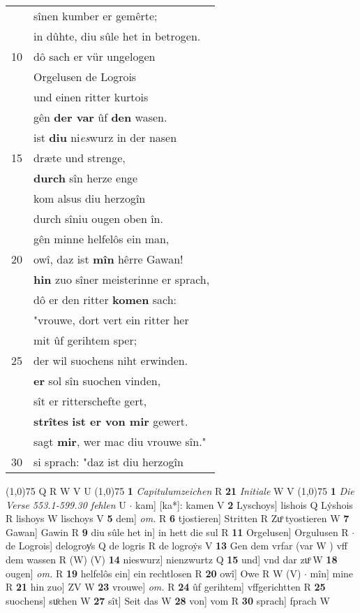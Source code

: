 \documentclass[8pt,a4paper,notitlepage]{article}
\begin{document}
\begin{table}[ht]
\begin{minipage}[t]{0.5\linewidth}
\begin{tabular}{rl}
 & sînen kumber er gemêrte;\\ 
 & in dûhte, diu sûle het in betrogen.\\ 
10 & dô sach er vür ungelogen\\ 
 & Orgelusen de Logrois\\ 
 & und einen ritter kurtois\\ 
 & gên \textbf{der var} ûf \textbf{den} wasen.\\ 
 & ist \textbf{diu} ni\textit{es}wurz in der nasen\\ 
15 & dræte und strenge,\\ 
 & \textbf{durch} sîn herze enge\\ 
 & kom alsus diu herzogîn\\ 
 & durch sîniu ougen oben în.\\ 
 & gên minne helfelôs ein man,\\ 
20 & owî, daz ist \textbf{mîn} hêrre Gawan!\\ 
 & \textbf{hin} zuo sîner meisterinne er sprach,\\ 
 & dô er den ritter \textbf{komen} sach:\\ 
 & "vrouwe, dort vert ein ritter her\\ 
 & mit ûf gerihtem sper;\\ 
25 & der wil suochens niht erwinden.\\ 
 & \textbf{er} sol sîn suochen vinden,\\ 
 & sît er ritterschefte gert,\\ 
 & \textbf{strîtes} \textbf{ist er von mir} gewert.\\ 
 & sagt \textbf{mir}, wer mac diu vrouwe sîn."\\ 
30 & si sprach: "daz ist diu herzogîn\\ 
\end{tabular}
\scriptsize
\line(1,0){75} \newline
Q R W V U \newline
\line(1,0){75} \newline
\textbf{1} \textit{Capitulumzeichen} R  \textbf{21} \textit{Initiale} W V  \newline
\line(1,0){75} \newline
\textbf{1} \textit{Die Verse 553.1-599.30 fehlen} U   $\cdot$ kam] [ka*]: kamen V \textbf{2} Lyschoys] lishois Q Lẏshois R lishoys W lischoys V \textbf{5} dem] \textit{om.} R \textbf{6} tjostieren] Stritten R Zuͦ tyostieren W \textbf{7} Gawan] Gawin R \textbf{9} diu sûle het in] in hett die sul R \textbf{11} Orgelusen] Orgulusen R  $\cdot$ de Logrois] delogroy͑s Q de logris R de logroẏs V \textbf{13} Gen dem vrfar (var W ) vff dem wassen R (W) (V) \textbf{14} nieswurz] nienzwurtz Q \textbf{15} und] vnd dar zuͦ W \textbf{18} ougen] \textit{om.} R \textbf{19} helfelôs ein] ein rechtlosen R \textbf{20} owî] Owe R W (V)  $\cdot$ mîn] mine R \textbf{21} hin zuo] ZV W \textbf{23} vrouwe] \textit{om.} R \textbf{24} ûf gerihtem] vffgerichtten R \textbf{25} suochens] suͦchen W \textbf{27} sît] Seit das W \textbf{28} von] vom R \textbf{30} sprach] fprach W \newline
\end{minipage}
\end{table}
\end{document}
